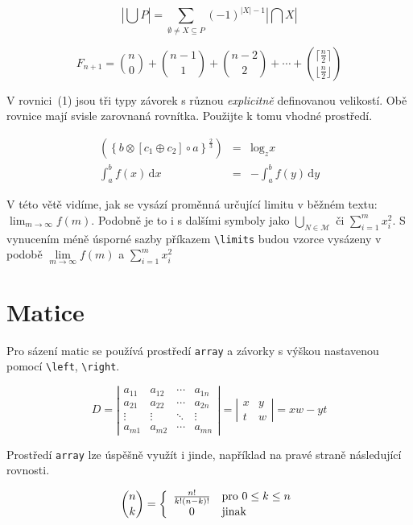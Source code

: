 \documentclass[a4paper, twocolumn, 11pt]{article}
\begin{document}
\begin{equation}
    \left|\bigcup P\right|=\sum\limits _{\emptyset\neq X\subseteq P}(-1)^{|X|-1}\left|\bigcap X\right|
\end{equation}

\begin{equation}
    F_{n+1}=\binom{n}{0}+\binom{n-1}{1}+\binom{n-2}{2}+\cdots+\binom{\lceil\frac{n}{2}\rceil}{\lfloor\frac{n}{2}\rfloor}
\end{equation}


V rovnici~(1) jsou tři typy závorek s různou \emph{explicitně} definovanou velikostí. Obě rovnice mají svisle zarovnaná rovnítka. Použijte k tomu vhodné prostředí.

\begin{eqnarray}
\left(\left\{b\otimes[c_1\oplus c_2]\circ a\right\}^{\frac{2}{3}}\right) & = & \mathrm{log}_z x\\
\int_a^b f(x)\,\mathrm{d}x & = & -\int_a^b f(y)\,\mathrm{d}y
\end{eqnarray}

\noindent V této větě vidíme, jak se vysází proměnná určující limitu v běžném textu: $\lim_{m\rightarrow\infty} f(m)$. Podobně je to i s dalšími symboly jako $\bigcup_{N \in \mathcal{M}}$ či $\sum_{i=1}^m x_i^2$. S vynucením méně úsporné sazby příkazem \verb|\limits| budou vzorce vysázeny v podobě $\lim\limits _{m\rightarrow\infty}f(m)$ a $\sum\limits _{i=1}^m x_i^2$

\section{Matice}

Pro sázení matic se používá prostředí \texttt{array} a závorky s výškou nastavenou pomocí \verb|\left|, \verb|\right|.

$$D=
\left|
\begin{array}{cccc}
    a_{11} & a_{12} & \cdots & a_{1n}\\
    a_{21} & a_{22} & \cdots & a_{2n}\\
    \vdots & \vdots & \ddots & \vdots\\
    a_{m1} & a_{m2} & \cdots & a_{mn}
\end{array}
\right|
=
\left|
\begin{array}{cc}
    x & y\\
    t & w
\end{array}
\right|
=xw-yt$$

Prostředí \texttt{array} lze úspěšně využít i jinde, například na pravé straně následující rovnosti.

$$\binom{n}{k}=
\left\{
\begin{array}{c l}
    \frac{n!}{k!(n-k)!} & \text{pro } 0\leq k\leq n\\
    0 & \text{jinak}
\end{array}
\right.$$
\end{document}
